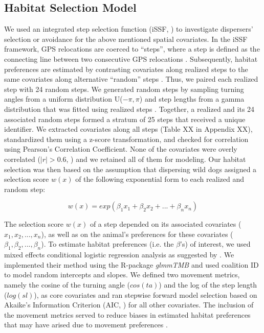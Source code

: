 \documentclass[abstract=on,10pt,a4paper,bibliography=totocnumbered]{article}
\begin{document}
\subsection{Habitat Selection Model}
We used an integrated step selection function (iSSF, \citealp{Avgar.2016}) to
investigate dispersers' selection or avoidance for the above mentioned spatial
covariates. In the iSSF framework, GPS relocations are coerced to  ``steps'',
where a step is defined as the connecting line between two consecutive GPS
relocations \citep{Turchin.1998}. Subsequently, habitat preferences are
estimated by contrasting covariates along realized steps to the same covariates
along alternative ``random''  steps \citep{Fortin.2005, Thurfjell.2014,
Avgar.2016}. Thus, we paired each realized step with 24 random steps. We
generated random steps by sampling turning angles from a uniform distribution
U(\(-\pi, \pi\)) and step lengths from a gamma distribution that was fitted
using realized steps \citep{Avgar.2016}. Together, a realized and its 24
associated random steps formed a stratum of 25 steps that received a unique
identifier. We extracted covariates along all steps (Table XX in Appendix XX),
standardized them using a z-score transformation, and checked for correlation
using Pearson's Correlation Coefficient. None of the covariates were overly
correlated (\(|r| > 0.6\), \citealp{Latham.2011}) and we retained all of them
for modeling. Our habitat selection was then based on the assumption that
dispersing wild dogs assigned a selection score \(w(x)\) of the following
exponential form to each realized and random step:

\begin{equation}
\label{EQ1}
  w(x) = exp(\beta_1 x_1 + \beta_2 x_2 + ... + \beta_n x_n)
\end{equation}

\noindent The selection score \(w(x)\) of a step depended on its associated
covariates (\(x_1, x_2, ..., x_n\)), as well as on the animal's preferences for
these covariates (\(\beta_1, \beta_2, ..., \beta_n\)). To estimate habitat
preferences (i.e. the \(\beta\)'s) of interest, we used mixed effects
conditional logistic regression analysis as suggested by \cite{Muff.2019}. We
implemented their method using the R-package \textit{glmmTMB}
\citep{Mollie.2017} and used coalition ID to model random intercepts and slopes.
We defined two movement metrics, namely the cosine of the turning angle
(\(cos(ta)\)) and the log of the step length (\(log(sl)\)), as core covariates
and ran stepwise forward model selection based on Akaike's Information Criterion
(AIC, \citealp{Burnham.2002}) for all other covariates. The inclusion of the
movement metrics served to reduce biases in estimated habitat preferences that
may have arised due to movement preferences \citep{Avgar.2016}.
\end{document}
